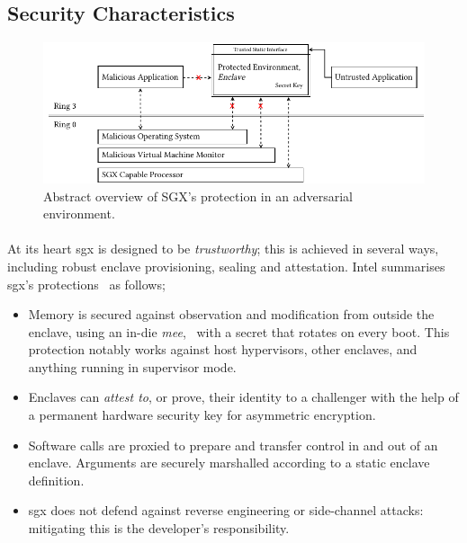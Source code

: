\subsection{Security Characteristics}

\begin{figure}[]
    \centering
    \includegraphics[width=0.95\linewidth]{figures/SGX-architecture.pdf}
    \caption{Abstract overview of SGX's protection in an adversarial environment.}
    \label{fig:sgx-basic}
\end{figure}

\paragraph{} At its heart \acrshort{sgx} is designed to be \textit{trustworthy}; this is achieved in several ways, including robust enclave provisioning, sealing and attestation. Intel summarises \acrshort{sgx}'s protections~\cite{10.1145/2487726.2488368,sgx-eval-sdk} as follows;

\begin{itemize}
    \item Memory is secured against observation and modification from outside the enclave, using an in-die \textit{\acrfull{mee}},~\cite{sgx-mee} with a secret that rotates on every boot. This protection notably works against host hypervisors, other enclaves, and anything running in supervisor mode.
    \item Enclaves can \textit{attest to}, or prove, their identity to a challenger with the help of a permanent hardware security key for asymmetric encryption.
    \item Software calls are proxied to prepare and transfer control in and out of an enclave. Arguments are securely marshalled according to a static enclave definition.
    \item \acrshort{sgx} does not defend against reverse engineering or side-channel attacks:~\cite{10.1109/SP.2015.45} mitigating this is the developer's responsibility.
\end{itemize}

